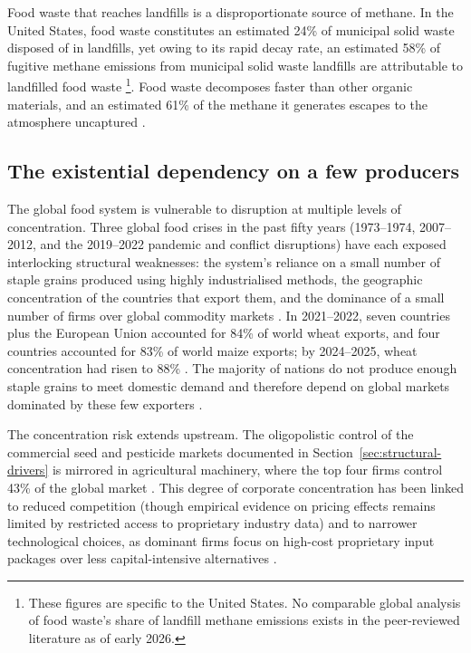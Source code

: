 Food waste that reaches landfills is a disproportionate source of methane.
In the United States, food waste constitutes an estimated 24\% of
municipal solid waste disposed of in landfills, yet owing to its rapid
decay rate, an estimated 58\% of fugitive methane emissions from municipal
solid waste landfills are attributable to landfilled food waste
\cite[Table~A1; Table~3]{epa2023methane}\footnote{These figures are specific to the United
States. No comparable global analysis of food waste's share of landfill
methane emissions exists in the peer-reviewed literature as of early
2026.}. Food waste decomposes faster than other organic materials, and an
estimated 61\% of the methane it generates escapes to the atmosphere
uncaptured \cite[p.~iii]{epa2023methane}.

\subsection{The existential dependency on a few producers}

The global food system is vulnerable to disruption at multiple levels of
concentration. Three global food crises in the past fifty
years (1973--1974, 2007--2012, and the 2019--2022 pandemic and
conflict disruptions) have each exposed interlocking structural
weaknesses: the system's reliance on a small number of staple grains
produced using highly industrialised methods, the geographic concentration
of the countries that export them, and the dominance of a small number of
firms over global commodity markets
\cite[pp.~1--2]{clapp2023concentration}. In 2021--2022, seven countries plus the European Union accounted for
84\% of world wheat exports, and four countries accounted for 83\% of
world maize exports; by 2024--2025, wheat concentration had risen to
88\% \cite[pp.~16,~25]{usda2025grain}. The majority of nations do not
produce enough staple grains to meet domestic demand and therefore depend
on global markets dominated by these few exporters
\cite[p.~6]{clapp2023concentration}.

The concentration risk extends upstream. The oligopolistic control of the commercial seed and pesticide markets documented in Section~\ref{sec:structural-drivers} is mirrored in agricultural machinery, where the top four firms control 43\% of the global market \cite[Table~4]{etcgroup2025agribusiness}. This degree of corporate concentration has been linked to reduced
competition (though empirical evidence on pricing effects remains limited
by restricted access to proprietary industry data) and to narrower
technological choices, as dominant firms focus on high-cost proprietary
input packages over less capital-intensive alternatives
\cite[pp.~404--406]{clapp2021concentration}.

